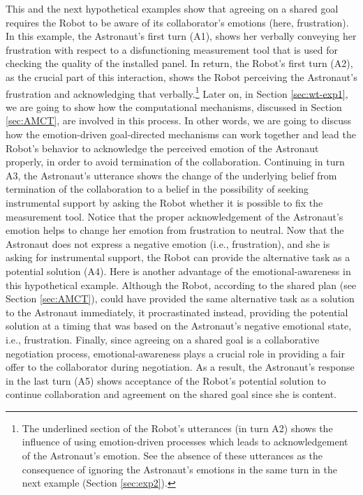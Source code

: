 This and the next hypothetical examples show that agreeing on a shared goal
requires the Robot to be aware of its collaborator's emotions (here,
frustration). In this example, the Astronaut's first turn (A1), shows her
verbally conveying her frustration with respect to a disfunctioning measurement
tool that is used for checking the quality of the installed panel. In return,
the Robot's first turn (A2), as the crucial part of this interaction, shows the
Robot perceiving the Astronaut's frustration and acknowledging that
verbally.\footnote{The underlined section of the Robot's utterances (in turn A2)
shows the influence of using emotion-driven processes which leads to
acknowledgement of the Astronaut's emotion. See the absence of these utterances
as the consequence of ignoring the Astronaut's emotions in the same turn in the
next example (Section \ref{sec:exp2}).} Later on, in Section \ref{sec:wt-exp1},
we are going to show how the computational mechanisms, discussed in Section
\ref{sec:AMCT}, are involved in this process. In other words, we are going to
discuss how the emotion-driven goal-directed mechanisms can work together and
lead the Robot's behavior to acknowledge the perceived emotion of the Astronaut
properly, in order to avoid termination of the collaboration. Continuing in turn
A3, the Astronaut's utterance shows the change of the underlying belief from
termination of the collaboration to a belief in the possibility of seeking
instrumental support by asking the Robot whether it is possible to fix the
measurement tool. Notice that the proper acknowledgement of the Astronaut's
emotion helps to change her emotion from frustration to neutral. Now that the
Astronaut does not express a negative emotion (i.e., frustration), and she is
asking for instrumental support, the Robot can provide the alternative task as a
potential solution (A4). Here is another advantage of the emotional-awareness in
this hypothetical example. Although the Robot, according to the shared plan
(see Section \ref{sec:AMCT}), could have provided the same alternative task as a
solution to the Astronaut immediately, it procrastinated instead, providing the
potential solution at a timing that was based on the Astronaut's negative
emotional state, i.e., frustration. Finally, since agreeing on a shared goal is
a collaborative negotiation process, emotional-awareness plays a crucial role in
providing a fair offer to the collaborator during negotiation. As a result, the
Astronaut's response in the last turn (A5) shows acceptance of the Robot's
potential solution to continue collaboration and agreement on the shared goal
since she is content. 

